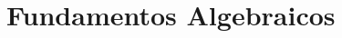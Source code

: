 \documentclass[12pt, a4paper, twoside]{book}
\begin{document}




\chapter{Fundamentos Algebraicos}

% 
% 
% 

% 
% 
% 

% 
% 
% 

% 
% 
% 

% 
% 
% 

% 
% 
% 

% 
% 
% 

% 
% 
% 

% 
% 
% 

% 
% 
% 
\end{document}
